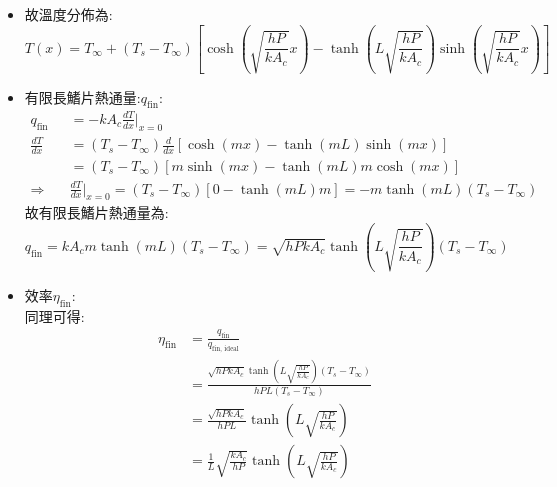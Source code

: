 \documentclass[../main.tex]{subfiles}
\begin{document}
\begin{itemize}
\begin{itemize}
\begin{itemize}
\begin{equation}
        \theta = (T_s - T_\infty) \left[
          \cosh(mx) - \tanh(mL) \sinh(mx)
        \right]
      \end{equation}
      \item 故溫度分佈為:
      \begin{equation}
        T(x) = \boxed{T_\infty + (T_s - T_\infty) \left[
          \cosh\left(\sqrt{\frac{hP}{kA_c}}x\right) - 
          \tanh\left(L\sqrt{\frac{hP}{kA_c}}\right) \sinh\left(\sqrt{\frac{hP}{kA_c}}x\right)
        \right] }\label{eq:heat_transfer_fin_finite_temperature_distribution}
      \end{equation}
      \item 有限長鰭片熱通量:$q_\text{fin}$:
      \begin{align}
        q_\text{fin} &= -kA_c \frac{dT}{dx}\bigg|_{x=0} \nonumber\\
        \frac{dT}{dx} &= (T_s - T_\infty) \frac{d}{dx}\left[
          \cosh(mx) - \tanh(mL) \sinh(mx)
        \right] \nonumber\\
        &= (T_s - T_\infty) \left[
          m \sinh(mx) - \tanh(mL) m \cosh(mx)
        \right] \nonumber\\
        \Rightarrow\quad& \frac{dT}{dx}\bigg|_{x=0} = (T_s - T_\infty) \left[
          0 - \tanh(mL) m 
        \right] = -m \tanh(mL) (T_s - T_\infty)
      \end{align}
      故有限長鰭片熱通量為:
      \begin{equation}
        q_\text{fin} = kA_c m \tanh(mL) (T_s - T_\infty) = \boxed{
          \sqrt{hPkA_c} \tanh\left(L\sqrt{\frac{hP}{kA_c}}\right) (T_s - T_\infty)
        } \label{eq:heat_transfer_fin_finite_heat_flux}
      \end{equation}
      \item 效率$\eta_\text{fin}$:\\
      同理可得:
      \begin{align}
        \eta_\text{fin} &= \frac{q_\text{fin}}{q_{\text{fin, ideal}}} \nonumber\\
        &= \frac{\sqrt{hPkA_c} \tanh\left(L\sqrt{\frac{hP}{kA_c}}\right) (T_s - T_\infty)}{h P L (T_s - T_\infty)} \nonumber\\
        &= \frac{\sqrt{hPkA_c}}{h P L} \tanh\left(L\sqrt{\frac{hP}{kA_c}}\right) \nonumber\\
        &= \boxed{\frac{1}{L} \sqrt{\frac{kA_c}{hP}} \tanh\left(L\sqrt{\frac{hP}{kA_c}}\right)} \label{eq:heat_transfer_fin_finite_efficiency}
      \end{align}
    \end{itemize}

\end{itemize}
\end{itemize}
\end{document}
